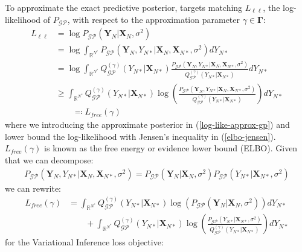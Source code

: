 \documentclass{article}
\newcommand{\GP}{\operatorname{\mathcal{GP}}}
\numberwithin{equation}{section}
\begin{document}
To approximate the exact predictive posterior, \cite{titsias2009variational} targets matching $L_{\ell \ell}$, the log-likelihood of $P_{\GP}$, with respect to the approximation parameter $\gamma \in \boldsymbol{\Gamma}$:
\begin{align}
    L_{\ell \ell} &= \log P_{\GP}\left(\mathbf{Y}_N \vert \mathbf{X}_N, \sigma^2\right) \\
     \label{log-like}
    &= \log \int_{\mathbb{R}^{N^*}} P_{\GP}\left(\mathbf{Y}_N, Y_{N*} \vert \mathbf{X}_{N}, \mathbf{X}_{N*}, \sigma^2\right) d Y_{N*} \\
     \label{log-like-approx-gp}
&= \log \int_{\mathbb{R}^{N^*}} Q^{(\gamma)}_{\GP}\left(Y_{N*} \vert \mathbf{X}_{N*}\right) \frac{P_{\GP}\left(\mathbf{Y}_N, Y_{N*} \vert \mathbf{X}_{N}, \mathbf{X}_{N*}, \sigma^2\right)}{Q^{(\gamma)}_{\GP}\left(Y_{N*} \vert \mathbf{X}_{N*}\right)} d Y_{N*}\\
&\geq \int_{\mathbb{R}^{N^*}} Q^{(\gamma)}_{\GP}\left(Y_{N*} \vert \mathbf{X}_{N*}\right) \log\left(\frac{P_{\GP}\left(\mathbf{Y}_N, Y_{N*} \vert \mathbf{X}_{N}, \mathbf{X}_{N*}, \sigma^2\right)}{Q^{(\gamma)}_{\GP}\left(Y_{N*} \vert \mathbf{X}_{N*}\right)} \right)d Y_{N*}
 \label{elbo-jensen}
 \\ & \qquad \eqqcolon L_{free}(\gamma)
 \label{elbo-definition}
\end{align}
where we introducing the approximate posterior in (\ref{log-like-approx-gp}) and lower bound the log-likelihood with Jensen's inequality in (\ref{elbo-jensen}). $L_{free}(\gamma)$ is known as the free energy or evidence lower bound (ELBO). Given that we can decompose:
\begin{align}
    P_{\GP}\left(\mathbf{Y}_N, Y_{N*} \vert \mathbf{X}_{N}, \mathbf{X}_{N*}, \sigma^2\right) = P_{\GP} \left(\mathbf{Y}_N \vert \mathbf{X}_{N}, \sigma^2\right) P_{\GP}\left(Y_{N*}\vert \mathbf{X}_{N*}, \sigma^2 \right)
\end{align}
we can rewrite:
\begin{align}
    L_{free}(\gamma) &= \int_{\mathbb{R}^{N^*}} Q^{(\gamma)}_{\GP}(Y_{N*} \vert \mathbf{X}_{N*}) \log \left(P_{\GP}\left(\mathbf{Y}_N \vert \mathbf{X}_{N}, \sigma^2\right)\right) d Y_{N*} \nonumber
    \\ & \qquad + \int_{\mathbb{R}^{N^*}} Q^{(\gamma)}_{\GP}(Y_{N*} \vert \mathbf{X}_{N*}) \log \left(\frac{P_{\GP}\left( Y_{N*} \vert \mathbf{X}_{N*}, \sigma^2\right) }{Q^{(\gamma)}_{\GP}\left(Y_{N*} \vert \mathbf{X}_{N*}\right)}\right) d Y_{N*}
\end{align}
for the Variational Inference loss objective:
\end{document}
